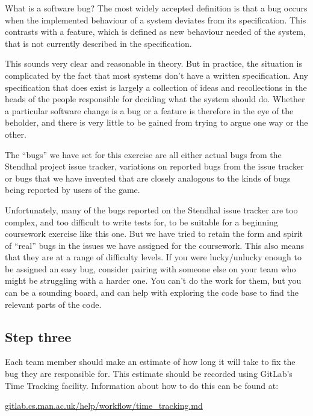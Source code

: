 \documentclass[
]{book}
\begin{document}
What is a software bug? The most widely accepted definition is that a bug occurs when the implemented behaviour of a system deviates from its specification. This contrasts with a feature, which is defined as new behaviour needed of the system, that is not currently described in the specification.

This sounds very clear and reasonable in theory. But in practice, the situation is complicated by the fact that most systems don't have a written specification. Any specification that does exist is largely a collection of ideas and recollections in the heads of the people responsible for deciding what the system should do. Whether a particular software change is a bug or a feature is therefore in the eye of the beholder, and there is very little to be gained from trying to argue one way or the other.

The ``bugs'' we have set for this exercise are all either actual bugs from the Stendhal project issue tracker, variations on reported bugs from the issue tracker or bugs that we have invented that are closely analogous to the kinds of bugs being reported by users of the game.

Unfortunately, many of the bugs reported on the Stendhal issue tracker are too complex, and too difficult to write tests for, to be suitable for a beginning coursework exercise like this one. But we have tried to retain the form and spirit of ``real'' bugs in the issues we have assigned for the coursework. This also means that they are at a range of difficulty levels. If you were lucky/unlucky enough to be assigned an easy bug, consider pairing with someone else on your team who might be struggling with a harder one. You can't do the work for them, but you can be a sounding board, and can help with exploring the code base to find the relevant parts of the code.

\hypertarget{stepthree}{%
\subsection{Step three}\label{stepthree}}

Each team member should make an estimate of how long it will take to fix the bug they are responsible for. This estimate should be recorded using GitLab's Time Tracking facility. Information about how to do this can be found at:

\href{https://gitlab.cs.man.ac.uk/help/workflow/time_tracking.md}{gitlab.cs.man.ac.uk/help/workflow/time\_tracking.md}
\end{document}
